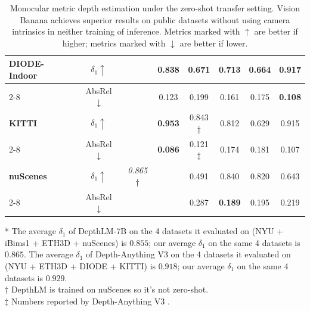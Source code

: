 \documentclass[11pt, a4paper, copyright, gdm]{google}
\begin{document}
\begin{table}[t]
{\begin{tabular}{|l|c|c|c|c|c|c|c|}
\textbf{DIODE-Indoor} & $\delta_1 \uparrow$ & & 0.838 & 0.671 & 0.713 & 0.664 & \textbf{\color{win_green}0.917} \\ \cline{2-8}
{\tiny \citep{diode_dataset}} & AbsRel $\downarrow$ & & 0.123 & 0.199 & 0.161 & 0.175 & \textbf{\color{win_green}0.108} \\ \hline

\textbf{KITTI} & $\delta_1 \uparrow$ & & \textbf{\color{win_green}0.953} & 0.843$\ddagger$ & 0.812 & 0.629 & 0.915 \\ \cline{2-8}
{\tiny \citep{Uhrig2017THREEDV_kitti}} & AbsRel $\downarrow$ & & \textbf{\color{win_green}0.086} & 0.121$\ddagger$ & 0.174 & 0.181 & 0.107 \\ \hline

\textbf{nuScenes} & $\delta_1 \uparrow$ & \textit{\color{win_green}0.865}$\dagger$ & & 0.491 & 0.840 & 0.820 & 0.643 \\ \cline{2-8}
{\tiny \citep{caesar2020nuscenes}} & AbsRel $\downarrow$ & & & 0.287 & \textbf{\color{win_green}0.189} & 0.195 & 0.219 \\ \hline

\end{tabular}
}
\raggedright
\footnotesize{
* The average $\delta_1$ of DepthLM-7B on the 4 datasets it evaluated on (NYU + iBims1 + ETH3D + nuScenes) is $0.855$; our average $\delta_1$ on the same 4 datasets is $0.865$. The average $\delta_1$ of Depth-Anything V3 on the 4 datasets it evaluated on (NYU + ETH3D + DIODE + KITTI) is $0.918$; our average $\delta_1$ on the same 4 datasets is $0.929$. \\
$\dagger$ DepthLM is trained on nuScenes so it’s not zero-shot. \\
$\ddagger$ Numbers reported by Depth-Anything V3 \citep{dav3}. }

\caption{Monocular metric depth estimation under the zero-shot transfer setting. Vision Banana achieves superior results on public datasets without using camera intrinsics in neither training of inference. 
Metrics marked with $\uparrow$ are better if higher; metrics marked with $\downarrow$ are better if lower.
}
\label{tab:depth}
\end{table}
\end{document}
